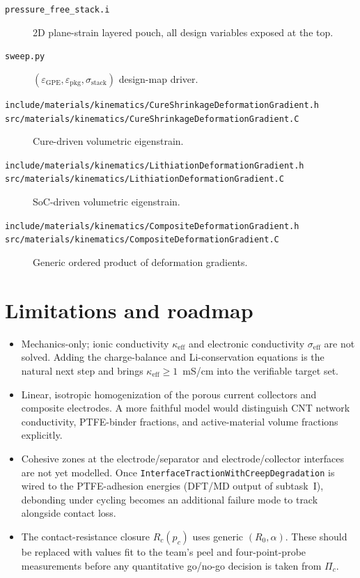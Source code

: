 \documentclass[11pt,letterpaper]{article}
\begin{document}
\begin{description}
\item[\texttt{pressure\_free\_stack.i}]
2D plane-strain layered pouch, all design variables exposed at the top.
\item[\texttt{sweep.py}]
$(\varepsilon_{\text{GPE}}, \varepsilon_{\text{pkg}},
\sigma_{\text{stack}})$ design-map driver.
\item[\texttt{include/materials/kinematics/CureShrinkageDeformationGradient.h}\\
\texttt{src/materials/kinematics/CureShrinkageDeformationGradient.C}]
Cure-driven volumetric eigenstrain.
\item[\texttt{include/materials/kinematics/LithiationDeformationGradient.h}\\
\texttt{src/materials/kinematics/LithiationDeformationGradient.C}]
SoC-driven volumetric eigenstrain.
\item[\texttt{include/materials/kinematics/CompositeDeformationGradient.h}\\
\texttt{src/materials/kinematics/CompositeDeformationGradient.C}]
Generic ordered product of deformation gradients.
\end{description}

\section{Limitations and roadmap}

\begin{itemize}
\item Mechanics-only; ionic conductivity $\kappa_{\text{eff}}$ and
electronic conductivity $\sigma_{\text{eff}}$ are not solved.  Adding
the charge-balance and Li-conservation equations is the natural next
step and brings $\kappa_{\text{eff}} \ge 1$~mS/cm
into the verifiable target set.
\item Linear, isotropic homogenization of the porous current collectors
and composite electrodes.  A more faithful model would distinguish CNT
network conductivity, PTFE-binder fractions, and active-material
volume fractions explicitly.
\item Cohesive zones at the electrode/separator and electrode/collector
interfaces are not yet modelled.  Once
\texttt{InterfaceTractionWithCreepDegradation} is wired to the
PTFE-adhesion energies (DFT/MD output of subtask~I), debonding under
cycling becomes an additional failure mode to track alongside contact
loss.
\item The contact-resistance closure $R_c(p_c)$ uses generic
$(R_0, \alpha)$.  These should be replaced with values fit to the
team's peel and four-point-probe measurements before any quantitative
go/no-go decision is taken from $\Pi_c$.
\end{itemize}
\end{document}
